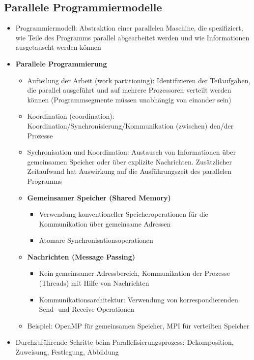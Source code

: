 \subsection{Parallele Programmiermodelle}
\begin{itemize}
	\item Programmiermodell: Abstraktion einer parallelen Maschine, die spezifiziert, wie Teile des Programms parallel abgearbeitet werden und wie Informationen ausgetauscht werden können
	\item \textbf{Parallele Programmierung}
	\begin{itemize}
		\item Aufteilung der Arbeit (work partitioning): Identifizieren der Teilaufgaben, die parallel ausgeführt und auf mehrere Prozessoren verteilt werden können (Programmsegmente müssen unabhängig von einander sein)
		\item Koordination (coordination): Koordination/Synchronisierung/Kommunikation (zwischen) den/der Prozesse
		\item Sychronisation und Koordination: Austausch von Informationen über gemeinsamen Speicher oder über explizite Nachrichten. Zusätzlicher Zeitaufwand hat Auswirkung auf die Ausführungszeit des parallelen Programms
		\item \textbf{Gemeinsamer Speicher (Shared Memory)}
		\begin{itemize}
			\item Verwendung konventioneller Speicheroperationen für die Kommunikation über gemeinsame Adressen
			\item Atomare Synchronisationsoperationen
		\end{itemize}
		\item \textbf{Nachrichten (Message Passing)}
		\begin{itemize}
			\item Kein gemeinsamer Adressbereich, Kommunikation der Prozesse (Threads) mit Hilfe von Nachrichten
			\item Kommunikationsarchitektur: Verwendung von korrespondierenden Send- und Receive-Operationen
		\end{itemize}
		\item Beispiel: OpenMP für gemeinsamen Speicher, MPI für verteilten Speicher
	\end{itemize}
	\item Durchzuführende Schritte beim Parallelisierungsprozess: Dekomposition, Zuweisung, Festlegung, Abbildung
\end{itemize}


